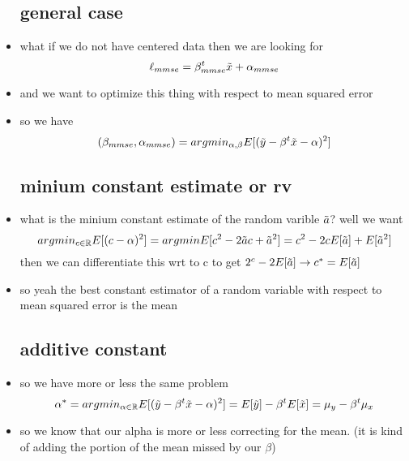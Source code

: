 \documentclass{article}
\begin{document}
\begin{itemize}
\subsection*{general case}
\item what if we do not have centered data then we are looking for $$\ell_{mmse}=\beta^t_{mmse}\Tilde{x}+\alpha_{mmse}$$
\item and we want to optimize this thing with respect to mean squared error 
\item so we have $$(\beta_{mmse}, \alpha_{mmse})=argmin_{\alpha,\beta}E[(\Tilde{y}-\beta^t\Tilde{x}-\alpha
)^2]$$
\subsection*{minium constant estimate or rv }
\item what is the minium constant estimate of the random varible $\Tilde{a}$? well we want $$argmin_{c\in \mathbb{R}}E[(c-\alpha)^2]=
argmin E[c^2-2\Tilde{a} c + \Tilde{a}^2]=c^2-2cE[\Tilde{a}]+E[\tilde{a}^2]$$
then we can differentiate this wrt to c to get $2^c-2E[\Tilde{a}]\rightarrow c^*=E[\Tilde{a}]$
\item so yeah the best constant estimator of a random variable with respect to mean squared error is the mean
\subsection*{additive constant}
\item so we have more or less the same problem $$\alpha^{*}=argmin_{\alpha \in \mathbb{R}}E[(\Tilde{y}-\beta^t\Tilde{x}-\alpha)^2]=E[\Tilde{y}]-\beta^tE[\Tilde{x}]=\mu_{y}-\beta^t\mu_{x}$$
\item so we know that our alpha is more or less correcting for the mean. (it is kind of adding the portion of the mean missed by our $\beta$)

\end{itemize}
\end{document}
